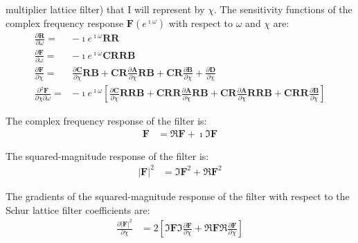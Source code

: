 \documentclass[a4paper,twoside,10pt,english]{article}
\begin{document}
multiplier lattice filter) that I will represent by $\chi$. The sensitivity
functions of the complex frequency response
$\mathbf{F}\left(e^{\imath\omega}\right)$ with respect to $\omega$ and $\chi$ are:
\begin{align*}
  \frac{\partial\mathbf{R}}{\partial{}\omega}
  =& -\imath{}e^{\imath\omega}\mathbf{R}\mathbf{R}\\
\frac{\partial\mathbf{F}}{\partial\omega}=&
-\imath e^{\imath\omega}\mathbf{C}\mathbf{R}\mathbf{R}\mathbf{B} \\
  \frac{\partial\mathbf{F}}{\partial{}\chi}=
   &\frac{\partial\mathbf{C}}{\partial\chi}\mathbf{R}\mathbf{B}+
\mathbf{C}\mathbf{R}\frac{\partial\mathbf{A}}{\partial\chi}\mathbf{R}\mathbf{B}+
\mathbf{C}\mathbf{R}\frac{\partial\mathbf{B}}{\partial\chi}+
     \frac{\partial\mathbf{D}}{\partial\chi}\\
\frac{\partial{}^{2}\mathbf{F}}{\partial\chi\partial\omega}=&
-\imath{}e^{\imath\omega}\left[
\frac{\partial\mathbf{C}}{\partial\chi}\mathbf{R}\mathbf{R}\mathbf{B}+
\mathbf{C}\mathbf{R}\mathbf{R}\frac{\partial\mathbf{A}}{\partial\chi}\mathbf{R}\mathbf{B}+
\mathbf{C}\mathbf{R}\frac{\partial\mathbf{A}}{\partial\chi}\mathbf{R}\mathbf{R}\mathbf{B}+
\mathbf{C}\mathbf{R}\mathbf{R}\frac{\partial\mathbf{B}}{\partial\chi}\right]
\end{align*}

The complex frequency response of the filter is:
\begin{align*}
\mathbf{F} &=\Re\mathbf{F} + \imath\Im\mathbf{F}
\end{align*}

The squared-magnitude response of the filter is:
\begin{align*}
\left|\mathbf{F}\right|^{2} &=\Im \mathbf{F}^{2} + \Re \mathbf{F}^{2}
\end{align*}

The gradients of the squared-magnitude response of the filter with respect to 
the Schur lattice filter coefficients are:
\begin{align*}
\frac{\partial\left|\mathbf{F}\right|^{2}}{\partial\chi}
&= 2\left[\Im \mathbf{F}\Im\frac{\partial\mathbf{F}}{\partial\chi}+
          \Re \mathbf{F}\Re\frac{\partial\mathbf{F}}{\partial\chi}\right]
\end{align*}
\end{document}
